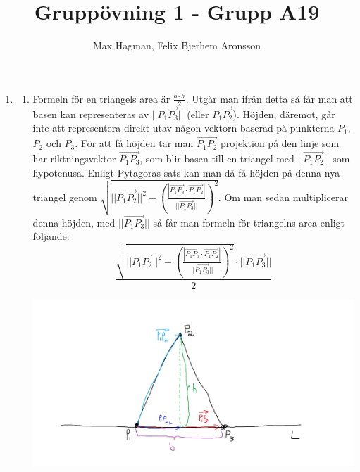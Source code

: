 \documentclass[a4paper]{report}
\title{Gruppövning 1 - Grupp A19}
\author{Max Hagman, Felix Bjerhem Aronsson}
\begin{document}
\maketitle

\begin{enumerate}
    \item \begin{enumerate}
              \item 
                Formeln för en triangels area är $\frac{b \cdot h}{2}$.
                    Utgår man ifrån detta så får man att basen kan representeras av $||\overrightarrow{P_{1}P_{3}}||$ (eller $\overrightarrow{P_{1}P_{2}}$).
                    Höjden, däremot, går inte att representera direkt utav någon vektorn baserad på punkterna $P_{1}$, $P_{2}$ och $P_{3}$.
                    För att få höjden tar man $\overrightarrow{P_{1}P_{2}}$ projektion på den linje som har riktningsvektor $\overrightarrow{P_{1}P_{3}}$, 
                    som blir basen till en triangel med $||\overrightarrow{P_{1}P_{2}}||$ som hypotenusa.
                    Enligt Pytagoras sats kan man då få höjden på denna nya triangel genom $\sqrt{ ||\overrightarrow{P_{1}P_{2}}||^{2} - (\frac{|\overrightarrow{P_{1}P_{3}}\cdot \overrightarrow{P_{1}P_{2}}|}{||\overrightarrow{P_{1}P_{3}}||})^{2}}$.
                    Om man sedan multiplicerar denna höjden, med $||\overrightarrow{P_{1}P_{3}}||$ så får man formeln för triangelns area enligt följande:\\
                    \begin{equation}
                         \frac{\sqrt{ ||\overrightarrow{P_{1}P_{2}}||^{2} - (\frac{|\overrightarrow{P_{1}P_{3}}\cdot \overrightarrow{P_{1}P_{2}}|}{||\overrightarrow{P_{1}P_{3}}||})^{2}}\cdot ||\overrightarrow{P_{1}P_{3}}||}{2}
                    \end{equation}

                    \begin{center}
                        \includegraphics[scale=0.15]{bild.png}
                    \end{center}


\end{enumerate}
\end{enumerate}
\end{document}

